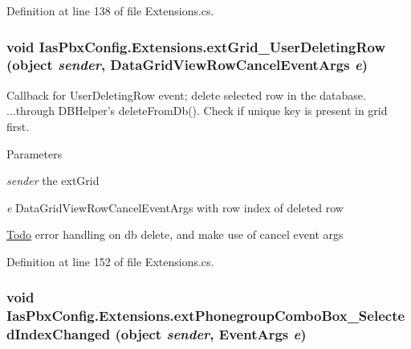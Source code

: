 Definition at line 138 of file Extensions.cs.\hypertarget{class_ias_pbx_config_1_1_extensions_a4fc7cbae23f7bbfe872a5a88d057a85e}{
\subsubsection[{extGrid\_\-UserDeletingRow}]{\setlength{\rightskip}{0pt plus 5cm}void IasPbxConfig.Extensions.extGrid\_\-UserDeletingRow (object {\em sender}, \/  DataGridViewRowCancelEventArgs {\em e})}}
\label{class_ias_pbx_config_1_1_extensions_a4fc7cbae23f7bbfe872a5a88d057a85e}


Callback for UserDeletingRow event; delete selected row in the database. ...through DBHelper's deleteFromDb(). Check if unique key is present in grid first.


\begin{DoxyParams}{Parameters}
\item[{\em sender}]the extGrid \item[{\em e}]DataGridViewRowCancelEventArgs with row index of deleted row \end{DoxyParams}
\begin{Desc}
\item[\hyperlink{todo__todo000034}{Todo}]error handling on db delete, and make use of cancel event args \end{Desc}


Definition at line 152 of file Extensions.cs.\hypertarget{class_ias_pbx_config_1_1_extensions_ac6212ae4230632279db1d1ddbafe463a}{
\subsubsection[{extPhonegroupComboBox\_\-SelectedIndexChanged}]{\setlength{\rightskip}{0pt plus 5cm}void IasPbxConfig.Extensions.extPhonegroupComboBox\_\-SelectedIndexChanged (object {\em sender}, \/  EventArgs {\em e})}}
\label{class_ias_pbx_config_1_1_extensions_ac6212ae4230632279db1d1ddbafe463a}


